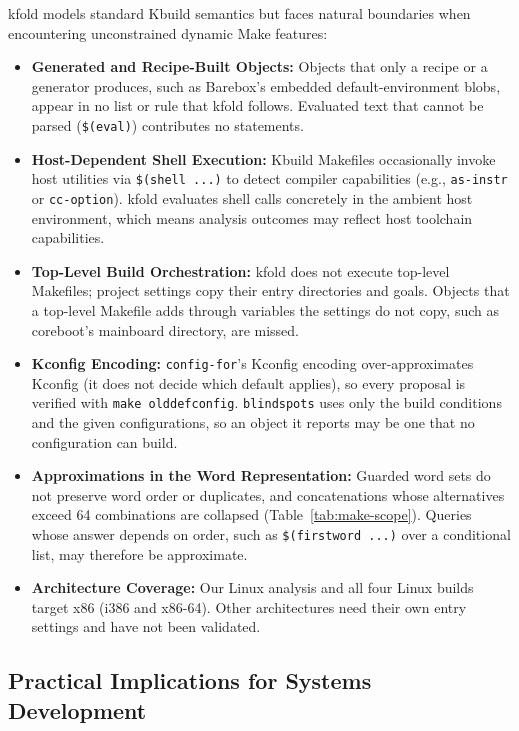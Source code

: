 \documentclass[acmsmall]{acmart}
\newcommand{\tool}{\textsf{kfold}\xspace}
\providecommand{\tightlist}{\setlength{\itemsep}{0pt}\setlength{\parskip}{0pt}}
\begin{document}
\tool models standard Kbuild semantics but faces natural boundaries when encountering unconstrained dynamic Make features:
\begin{itemize}
\tightlist
\item \textbf{Generated and Recipe-Built Objects:} Objects that only a recipe or a generator produces, such as Barebox's embedded default-environment blobs, appear in no list or rule that \tool follows. Evaluated text that cannot be parsed (\texttt{\$(eval)}) contributes no statements.
\item \textbf{Host-Dependent Shell Execution:} Kbuild Makefiles occasionally invoke host utilities via \texttt{\$(shell ...)} to detect compiler capabilities (e.g., \texttt{as-instr} or \texttt{cc-option}). \tool evaluates shell calls concretely in the ambient host environment, which means analysis outcomes may reflect host toolchain capabilities.
\item \textbf{Top-Level Build Orchestration:} \tool does not execute top-level Makefiles; project settings copy their entry directories and goals. Objects that a top-level Makefile adds through variables the settings do not copy, such as coreboot's mainboard directory, are missed.
\item \textbf{Kconfig Encoding:} \texttt{config-for}'s Kconfig encoding over-approximates Kconfig (it does not decide which default applies), so every proposal is verified with \texttt{make olddefconfig}. \texttt{blindspots} uses only the build conditions and the given configurations, so an object it reports may be one that no configuration can build.
\item \textbf{Approximations in the Word Representation:} Guarded word sets do not preserve word order or duplicates, and concatenations whose alternatives exceed 64 combinations are collapsed (Table~\ref{tab:make-scope}). Queries whose answer depends on order, such as \texttt{\$(firstword ...)} over a conditional list, may therefore be approximate.
\item \textbf{Architecture Coverage:} Our Linux analysis and all four Linux builds target x86 (i386 and x86-64). Other architectures need their own entry settings and have not been validated.
\end{itemize}

\subsection{Practical Implications for Systems Development}\label{sec:discussion:implications}
\end{document}
